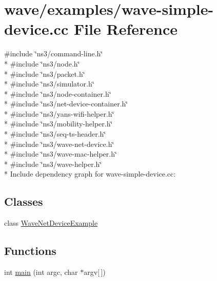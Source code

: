 \hypertarget{wave-simple-device_8cc}{}\section{wave/examples/wave-\/simple-\/device.cc File Reference}
\label{wave-simple-device_8cc}
{\ttfamily \#include \char`\"{}ns3/command-\/line.\+h\char`\"{}}\\*
{\ttfamily \#include \char`\"{}ns3/node.\+h\char`\"{}}\\*
{\ttfamily \#include \char`\"{}ns3/packet.\+h\char`\"{}}\\*
{\ttfamily \#include \char`\"{}ns3/simulator.\+h\char`\"{}}\\*
{\ttfamily \#include \char`\"{}ns3/node-\/container.\+h\char`\"{}}\\*
{\ttfamily \#include \char`\"{}ns3/net-\/device-\/container.\+h\char`\"{}}\\*
{\ttfamily \#include \char`\"{}ns3/yans-\/wifi-\/helper.\+h\char`\"{}}\\*
{\ttfamily \#include \char`\"{}ns3/mobility-\/helper.\+h\char`\"{}}\\*
{\ttfamily \#include \char`\"{}ns3/seq-\/ts-\/header.\+h\char`\"{}}\\*
{\ttfamily \#include \char`\"{}ns3/wave-\/net-\/device.\+h\char`\"{}}\\*
{\ttfamily \#include \char`\"{}ns3/wave-\/mac-\/helper.\+h\char`\"{}}\\*
{\ttfamily \#include \char`\"{}ns3/wave-\/helper.\+h\char`\"{}}\\*
Include dependency graph for wave-\/simple-\/device.cc\+:
\subsection*{Classes}
\begin{DoxyCompactItemize}
\item 
class \hyperlink{classWaveNetDeviceExample}{Wave\+Net\+Device\+Example}
\end{DoxyCompactItemize}
\subsection*{Functions}
\begin{DoxyCompactItemize}
\item 
int \hyperlink{wave-simple-device_8cc_a0ddf1224851353fc92bfbff6f499fa97}{main} (int argc, char $\ast$argv\mbox{[}$\,$\mbox{]})
\end{DoxyCompactItemize}


